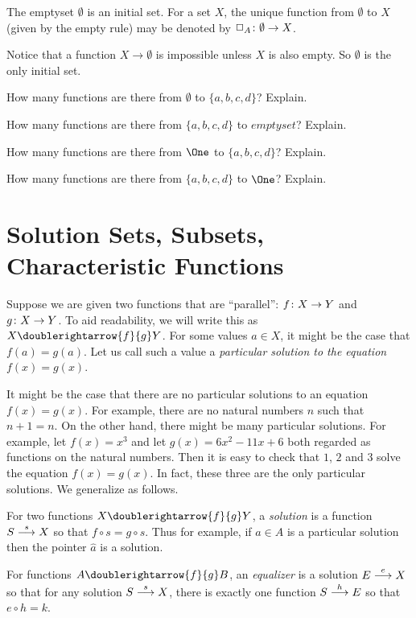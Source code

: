 \begin{principle}
	The emptyset $\emptyset$ is an initial set. For a set $X$, the unique
	function from $\emptyset$ to $X$ (given by the empty rule) may be denoted by 
	$\fromto {\Box_A}\emptyset X$.
\end{principle}

Notice that a function $X\to\emptyset$ is impossible unless $X$ is also empty.
So $\emptyset$ is the only initial set. 

\begin{exercises}
	\begin{nextexercise}
		\item How many functions are there from $\emptyset$ to $\{a,b,c,d\}$? Explain.
		\item How many functions are there from $\{a,b,c,d\}$ to $emptyset$? Explain.
		\item How many functions are there from $\One$ to $\{a,b,c,d\}$? Explain.
		\item How many functions are there from $\{a,b,c,d\}$ to $\One$? Explain.
	\end{nextexercise}
\end{exercises}

\section{Solution Sets, Subsets, Characteristic Functions}

Suppose we are given two functions that are ``parallel'': $\fromto fXY$ and $\fromto gXY$. 
To aid readability, we will write this as $X\doublerightarrow{f}{g}Y$.
For some values $a\in X$, it might be the case that $f(a)=g(a)$.
Let us call such a value a \emph{particular solution to the equation $f(x)=g(x)$}. 

It might be the case that there are no particular solutions to an equation $f(x)=g(x)$.
For example, there are no natural numbers $n$ such that $n+1 = n$. 
On the other hand, there might be many particular solutions. 
For example, let $f(x)=x^3$ and let $g(x)= 6x^2 - 11x + 6$ both regarded as functions on the natural numbers.
Then it is easy to check that $1$, $2$ and $3$ solve the equation $f(x)=g(x)$.
In fact, these three are the only particular solutions.
We generalize as follows.

\begin{defn}\label{def:equalizer} 
	For two functions $X\doublerightarrow{f}{g} Y$, a \emph{solution} is a function $\sfromto sSX$ so that 
	$f\circ s = g\circ s$.
	Thus for example, if $a\in A$ is a particular solution then the pointer $\hat a$ is a solution.

	For functions $A\doublerightarrow{f}{g} B$, an \emph{equalizer} is a solution $\sfromto eEX$ so that for any solution $\sfromto sSX$, there is exactly one function $\sfromto hSE$ so that $e\circ h = k$.
\end{defn}

